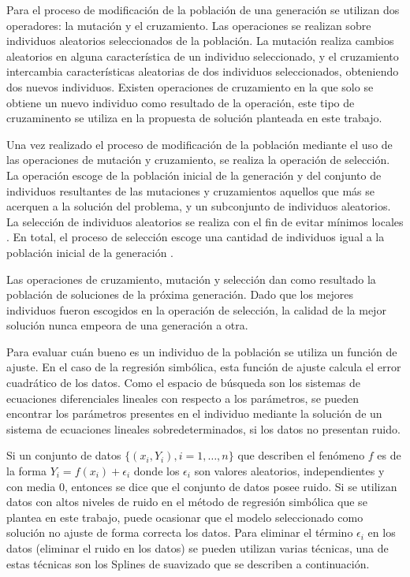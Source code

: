 Para el proceso de modificación de la población de una generación se utilizan dos operadores: la mutación y el cruzamiento. Las operaciones se realizan sobre individuos aleatorios seleccionados de la población. La mutación realiza cambios aleatorios en alguna característica de un individuo seleccionado, y el cruzamiento intercambia características aleatorias de dos individuos seleccionados, obteniendo dos nuevos individuos. Existen operaciones de cruzamiento en la que solo se obtiene un nuevo individuo como resultado de la operación, este tipo de cruzaminento se utiliza en la propuesta de solución planteada en este trabajo.

Una vez realizado el proceso de modificación de la población mediante el uso de las operaciones de mutación y cruzamiento, se realiza la operación de selección. La operación escoge de la población inicial de la generación y del conjunto de individuos resultantes de las mutaciones y cruzamientos aquellos que más se acerquen a la solución del problema, y un subconjunto de individuos aleatorios. La selección de individuos aleatorios se realiza con el fin de evitar mínimos locales \cite{mitchell1998introduction}. En total, el proceso de selección escoge una cantidad de individuos igual a la población inicial de la generación \cite{mitchell1998introduction}.

Las operaciones de cruzamiento, mutación y selección dan como resultado la población de soluciones de la próxima generación. Dado que los mejores individuos fueron escogidos en la operación de selección, la calidad de la mejor solución nunca empeora de una generación a otra.

Para evaluar cuán bueno es un individuo de la población se utiliza un función de ajuste. En el caso de la regresión simbólica, esta función de ajuste calcula el error cuadrático de los datos. Como el espacio de búsqueda son los sistemas de ecuaciones diferenciales lineales con respecto a los parámetros, se pueden encontrar los parámetros presentes en el individuo mediante la solución de un sistema de ecuaciones lineales sobredeterminados, si los datos no presentan ruido.

Si un conjunto de datos $\{(x_i, Y_i), i=1, \dots, n\}$ que describen el fenómeno $f$ es de la forma $Y_i = f(x_i) + \epsilon _i$ donde los $\epsilon _i$ son valores aleatorios, independientes y con media 0, entonces se dice que el conjunto de datos posee ruido. Si se utilizan datos con altos niveles de ruido en el método de regresión simbólica que se plantea en este trabajo, puede ocasionar que el modelo seleccionado como solución no ajuste de forma correcta los datos. Para eliminar el término $\epsilon _i$ en los datos (eliminar el ruido en los datos) se pueden utilizan varias técnicas, una de estas técnicas son los Splines de suavizado que se describen a continuación.

